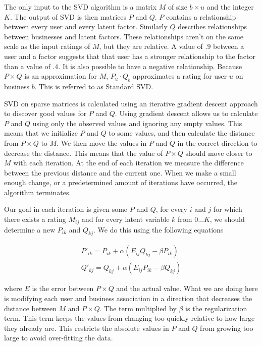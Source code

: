 The only input to the SVD algorithm is a matrix $M$ of size $b \times u$ and the
integer $K$. The output of SVD is then matrices $P$ and $Q$. $P$ contains a
relationship between every user and every latent factor. Similarly $Q$ describes
relationships between businesses and latent factors. These relationships aren't
on the same scale as the input ratings of $M$, but they are relative. A value
of $.9$ between a user and a factor suggests that that user has a stronger
relationship to the factor than a value of $.4$. It is also possible to have a
negative relationship. Because $P \times Q$ is an
approximation for $M$, $P_u \cdot Q_b$ approximates a rating for user $u$ on
business $b$. This is referred to as Standard SVD\cite{bellkor}.

SVD on sparse matrices is calculated using an iterative gradient descent
approach to discover good values for $P$ and $Q$. Using gradient descent allows
us to calculate $P$ and $Q$ using only the observed values and ignoring any
empty values. This means that we initialize $P$ and $Q$ to some values, and
then calculate the distance from $P \times Q$ to $M$. We then move the values
in $P$ and $Q$ in the correct direction to decrease the distance. 
This means that the value of $P \times Q$ should move closer
to $M$ with each iteration. At the end of each iteration we measure the
difference between the previous distance and the current one. When we make a
small enough change, or a predetermined amount of iterations have occurred, the algorithm terminates.

Our goal in each iteration is given some $P$ and $Q$, for every $i$ and $j$ for
which there exists a rating $M_{ij}$ and for every latent variable $k$ from
$0\ldots K$, we should determine a new $P_{ik}$ and $Q_{kj}$. We do this using the
following equations

\[
\begin{array}{c}
P'_{ik}=P_{ik} + \alpha(E_{ij}Q_{kj}-\beta P_{ik}) \\
Q'_{kj}=Q_{kj} + \alpha(E_{ij}P_{ik}-\beta Q_{kj})
\end{array}
\]

\noindent where $E$ is the error between $P \times Q$ and the actual value. What
we are doing here is modifying each user and business association in a direction
that decreases the distance between $M$ and $P \times Q$. The term multiplied by
$\beta$ is the regularization term. This term keeps the values from changing too
quickly relative to how large they already are. This restricts the absolute values in $P$ and
$Q$ from growing too large to avoid over-fitting the data.

